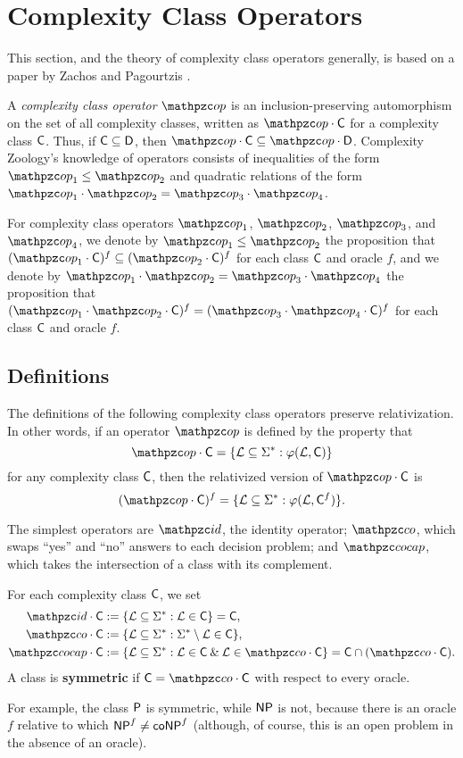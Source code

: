 \section{Complexity Class Operators}\label{operator-section}

This section, and the theory of complexity class operators generally, is based 
on a paper by Zachos and Pagourtzis \cite{zachos2003combinatory}.

A \textit{complexity class operator} $\op$ is an inclusion-preserving automorphism 
on the set of all complexity classes, written as $\op\cdot\sC$ for a complexity 
class $\mathsf{C}$. Thus, if $\mathsf{C}\subseteq\mathsf{D}$, then 
$\op\cdot\sC\subseteq\op\cdot\msf{D}$. Complexity Zoology's knowledge of operators 
consists of inequalities of the form $\op_1\leq\op_2$ and quadratic relations of 
the form $\op_1\cdot\op_2=\op_3\cdot\op_4$.
\begin{definition}
For complexity class operators $\op_1$, $\op_2$, $\op_3$, and $\op_4$, we denote by
$\op_1\leq\op_2$  the proposition that 
$(\op_1\cdot\sC)^f\subseteq(\op_2\cdot\sC)^f$ for each class $\mathsf{C}$ and oracle $f$, 
and we denote by $\op_1\cdot\op_2=\op_3\cdot\op_4$ the proposition that 
$(\op_1\cdot\op_2\cdot\sC)^f=(\op_3\cdot\op_4\cdot\sC)^f$ for each class $\mathsf{C}$ and 
oracle $f$.
\end{definition}

\subsection{Definitions}

The definitions of the following complexity
class operators preserve relativization. In other words, if an operator
$\op$ is defined by the property that
\[
  \op\cdot\sC=\{\cL\subseteq\Sigma^*:\varphi(\cL,\sC)\}
\]
for any complexity class $\mathsf{C}$, then the relativized version of
$\op\cdot\sC$ is
\[
  (\op\cdot\sC)^f=\{\cL\subseteq\Sigma^*:\varphi(\cL,\sC^f)\}.
\]

The simplest operators are $\id$, the identity operator; $\cco$, which swaps
``yes'' and ``no'' answers to each decision problem; and $\cocap$, which takes
the intersection of a class with its complement.

\begin{definition} For each complexity class $\mathsf{C}$, we set
\begin{align*}
  \id\cdot\sC&:=\{\cL\subseteq\Sigma^*:\cL\in\sC\}=\sC, \\
  \cco\cdot\sC&:=\{\cL\subseteq\Sigma^*:\Sigma^*\setminus\cL\in\sC\}, \\
  \cocap\cdot\sC&:=\{\cL\subseteq\Sigma^*:\cL\in\sC\AND\cL\in\cco\cdot\sC\}=
                  \sC\cap(\cco\cdot\sC).
\end{align*}
A class is \textbf{symmetric} if $\sC=\cco\cdot\sC$ with respect to every oracle.
\end{definition}
For example, the class $\mathsf{P}$ is symmetric, while $\mathsf{NP}$ is not, because there is
an oracle $f$ relative to which $\mathsf{NP}^f\neq\mathsf{co}\mathsf{NP}^f$ (although, of course, this
is an open problem in the absence of an oracle).

